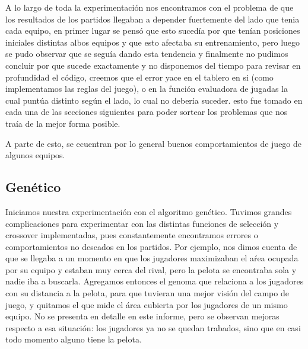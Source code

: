 
A lo largo de toda la experimentación nos encontramos con el problema de que los resultados de los partidos llegaban a depender
fuertemente del lado que tenia cada equipo, en primer lugar se pensó que esto sucedía por que tenían posiciones
iniciales distintas albos equipos y que esto afectaba su entrenamiento, pero luego se pudo observar que se seguía
dando esta tendencia y finalmente no pudimos concluir por que sucede exactamente y no disponemos del tiempo
para revisar en profundidad el código, creemos que el error yace en el tablero en si (como implementamos las reglas del juego),
 o en la función evaluadora de jugadas la cual puntúa distinto según el lado, lo cual no debería suceder.
 esto fue tomado en cada una de las secciones siguientes para poder sortear los problemas que nos traía de la mejor forma posible.


A parte de esto, se ecuentran por lo general buenos comportamientos de juego de algunos equipos.

\subsection{Genético}


Iniciamos nuestra experimentación con el algoritmo genético.
Tuvimos grandes complicaciones para experimentar con las distintas funciones de selección y crossover implementadas, pues constantemente encontramos errores o comportamientos no deseados en los partidos.
Por ejemplo, nos dimos cuenta de que se llegaba a un momento en que los jugadores maximizaban el aŕea ocupada por su equipo y estaban muy cerca del rival, pero la pelota se encontraba sola y nadie iba a buscarla.
Agregamos entonces el genoma que relaciona a los jugadores con su distancia a la pelota, para que tuvieran una mejor visión del campo de juego, y quitamos el que mide el área cubierta por los jugadores de un mismo equipo.
No se presenta en detalle en este informe, pero se observan mejoras respecto a esa situación: los jugadores ya no se quedan trabados, sino que en casi todo momento alguno tiene la pelota.

